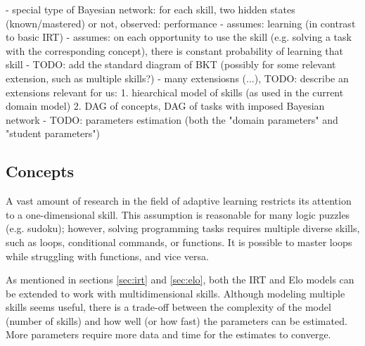 - special type of Bayesian network: for each skill, two hidden states (known/mastered) or not,
  observed: performance
- assumes: learning (in contrast to basic IRT)
- assumes: on each opportunity to use the skill (e.g. solving a task with the corresponding concept), there is constant probability of learning that skill
- TODO: add the standard diagram of BKT (possibly for some relevant extension, such as multiple skills?)
- many extensiosns (...), TODO: describe an extensions relevant for us:
1. hiearchical model of skills (as used in the current domain model)
2. DAG of concepts, DAG of tasks with imposed Bayesian network
- TODO: parameters estimation (both the "domain parameters" and "student parameters")


\subsection{Concepts}


A vast amount of research in the field of adaptive learning
  restricts its attention to a one-dimensional skill.
This assumption is reasonable for many logic puzzles (e.g. sudoku);
however, solving programming tasks requires multiple diverse skills,
  such as loops, conditional commands, or functions.
It is possible to master loops while struggling with functions,
  and vice versa.

As mentioned in sections \ref{sec:irt} and \ref{sec:elo},
  both the IRT and Elo models can be extended to work with multidimensional skills.
Although modeling multiple skills seems useful,
  there is a trade-off between the complexity of the model (number of skills)
  and how well (or how fast) the parameters can be estimated.
More parameters require more data and time for the estimates to converge.



